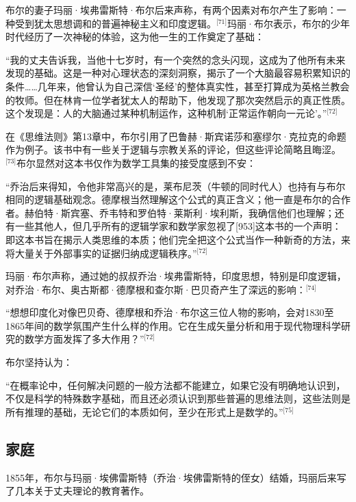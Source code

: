 布尔的妻子玛丽·埃弗雷斯特·布尔后来声称，有两个因素对布尔产生了影响：一种受到犹太思想调和的普遍神秘主义和印度逻辑。\(^\text{[71]}\)玛丽·布尔表示，布尔的少年时代经历了一次神秘的体验，这为他一生的工作奠定了基础：

“我的丈夫告诉我，当他十七岁时，有一个突然的念头闪现，这成为了他所有未来发现的基础。这是一种对心理状态的深刻洞察，揭示了一个大脑最容易积累知识的条件……几年来，他曾认为自己深信‘圣经’的整体真实性，甚至打算成为英格兰教会的牧师。但在林肯一位学者犹太人的帮助下，他发现了那次突然启示的真正性质。这个发现是：人的大脑通过某种机制运作，这种机制‘正常运作朝向一元论’。”\(^\text{[72]}\)

在《思维法则》第13章中，布尔引用了巴鲁赫·斯宾诺莎和塞缪尔·克拉克的命题作为例子。该书中有一些关于逻辑与宗教关系的评论，但这些评论简略且晦涩。\(^\text{[73]}\)布尔显然对这本书仅作为数学工具集的接受度感到不安：

“乔治后来得知，令他非常高兴的是，莱布尼茨（牛顿的同时代人）也持有与布尔相同的逻辑基础观念。德摩根当然理解这个公式的真正含义；他一直是布尔的合作者。赫伯特·斯宾塞、乔韦特和罗伯特·莱斯利·埃利斯，我确信他们也理解；还有一些其他人，但几乎所有的逻辑学家和数学家忽视了[953]这本书的一个声明：即这本书旨在揭示人类思维的本质；他们完全把这个公式当作一种新奇的方法，来将大量关于外部事实的证据归纳成逻辑秩序。”\(^\text{[72]}\)

玛丽·布尔声称，通过她的叔叔乔治·埃弗雷斯特，印度思想，特别是印度逻辑，对乔治·布尔、奥古斯都·德摩根和查尔斯·巴贝奇产生了深远的影响：\(^\text{[74]}\)

“想想印度化对像巴贝奇、德摩根和乔治·布尔这三位人物的影响，会对1830至1865年间的数学氛围产生什么样的作用。它在生成矢量分析和用于现代物理科学研究的数学方面发挥了多大作用？”\(^\text{[72]}\)

布尔坚持认为：

“在概率论中，任何解决问题的一般方法都不能建立，如果它没有明确地认识到，不仅是科学的特殊数字基础，而且还必须认识到那些普遍的思维法则，这些法则是所有推理的基础，无论它们的本质如何，至少在形式上是数学的。”\(^\text{[75]}\)
\subsection{家庭}  
1855年，布尔与玛丽·埃佛雷斯特（乔治·埃佛雷斯特的侄女）结婚，玛丽后来写了几本关于丈夫理论的教育著作。

